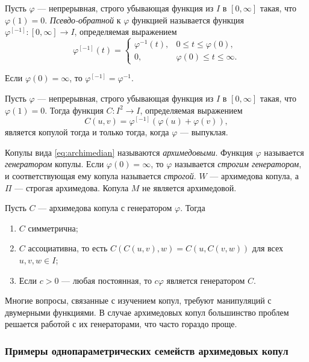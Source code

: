 \begin{define}
	Пусть $\varphi$ --- непрерывная, строго убывающая функция из $I$ в $[0, \infty]$ такая, что $\varphi(1) = 0$. \emph{Псевдо-обратной} к $\varphi$ функцией называется функция $\varphi^{[-1]} \colon [0, \infty] \to I$, определяемая выражением
\[
\varphi^{[-1]}(t) =
\begin{cases}
\varphi^{-1}(t) , &0 \leqslant t \leqslant \varphi(0), \\
0, &\varphi(0) \leqslant t \leqslant \infty.
\end{cases}
\]
\end{define}
Если $\varphi(0) = \infty$, то $\varphi^{[-1]} = \varphi^{-1}$.

\begin{theorem}
	Пусть $\varphi$ --- непрерывная, строго убывающая функция из $I$ в $[0, \infty]$ такая, что $\varphi(1) = 0$. Тогда функция $C \colon I^2 \to I$, определяемая выражением
	\begin{equation}\label{eq:archimedian}
		C(u, v) = \varphi^{[-1]}(\varphi(u) + \varphi(v)),
	\end{equation}
является копулой тогда и только тогда, когда $\varphi$ --- выпуклая.
\end{theorem}

Копулы вида \eqref{eq:archimedian} называются \emph{архимедовыми}. Функция $\varphi$ называется \emph{генератором} копулы. Если $\varphi(0) = \infty$, то $\varphi$ называется \emph{строгим генератором}, и соответствующая ему копула называется \emph{строгой}. $W$ --- архимедова копула, а $\Pi$ --- строгая архимедова. Копула $M$ не является архимедовой.

\begin{theorem}
	Пусть $C$ --- архимедова копула с генератором $\varphi$. Тогда
	\begin{enumerate}
	\item $C$ симметрична;
	\item $C$ ассоциативна, то есть $C(C(u, v), w) = C(u, C(v, w))$ для всех $u, v, w \in I$;
	\item Если $c > 0$ --- любая постоянная, то $c\varphi$ является генератором $C$.
	\end{enumerate}
\end{theorem}

Многие вопросы, связанные с изучением копул, требуют манипуляций с двумерными функциями. В случае архимедовых копул большинство проблем решается работой с их генераторами, что часто гораздо проще.

\subsubsection*{Примеры однопараметрических семейств архимедовых копул}


